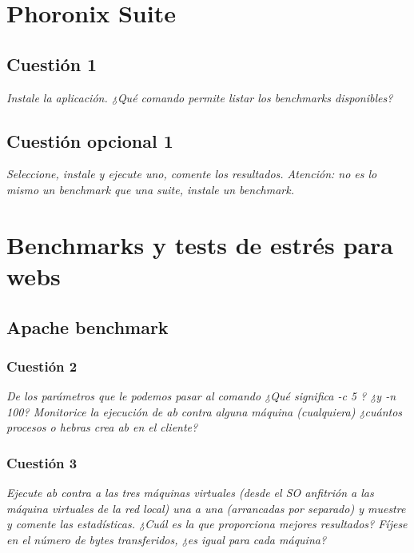 



\maketitle %
\newpage %
\tableofcontents %
\listoffigures
\newpage

\section{Phoronix Suite}
\subsection{Cuestión 1}
\textit{Instale la aplicación. ¿Qué comando permite listar los benchmarks disponibles?}

\subsection{Cuestión opcional 1}
\textit{Seleccione, instale y ejecute uno, comente los resultados. Atención: no es lo mismo un benchmark que una suite, instale un benchmark.}

\section{Benchmarks y tests de estrés para webs}
\subsection{Apache benchmark}
\subsubsection{Cuestión 2}
\textit{De los parámetros que le podemos pasar al comando ¿Qué
significa -c 5 ? ¿y -n 100? Monitorice la ejecución de ab contra alguna máquina (cualquiera) ¿cuántos procesos o hebras crea ab en el cliente?}

\subsubsection{Cuestión 3}
\textit{Ejecute ab contra a las tres máquinas virtuales (desde el SO anfitrión a las máquina virtuales de la red local) una a una (arrancadas por separado) y muestre y comente las estadísticas. ¿Cuál es la que proporciona mejores resultados? Fíjese en el número de bytes transferidos, ¿es igual para cada máquina?}

